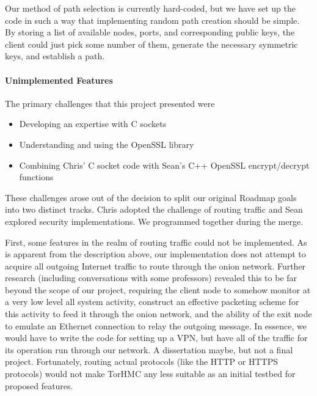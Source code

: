 \documentclass[12pt]{article}
\begin{document}
Our method of path selection is currently hard-coded, but we have set up the code in such a way that implementing random path creation should be simple. By storing a list of available nodes, ports, and corresponding public keys, the client could just pick some number of them, generate the necessary symmetric keys, and establish a path.

\paragraph{Unimplemented Features}
The primary challenges that this project presented were
\begin{itemize}
\item Developing an expertise with C sockets
\item Understanding and using the OpenSSL library
\item Combining Chris' C socket code with Sean's C++ OpenSSL encrypt/decrypt functions
\end{itemize}
These challenges arose out of the decision to split our original Roadmap goals into two distinct tracks. Chris adopted the challenge of routing traffic and Sean explored security implementations. We programmed together during the merge.

First, some features in the realm of routing traffic could not be implemented. As is apparent from the description above, our implementation does not attempt to acquire all outgoing Internet traffic to route through the onion network. Further research (including conversations with some professors) revealed this to be far beyond the scope of our project, requiring the client node to somehow monitor at a very low level all system activity, construct an effective packeting scheme for this activity to feed it through the onion network, and the ability of the exit node to emulate an Ethernet connection to relay the outgoing message. In essence, we would have to write the code for setting up a VPN, but have all of the traffic for its operation run through our network. A dissertation maybe, but not a final project. Fortunately, routing actual protocols (like the HTTP or HTTPS protocols) would not make TorHMC any less suitable as an initial testbed for proposed features.
\end{document}
